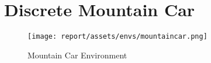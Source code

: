 \section{Discrete Mountain Car}
\begin{figure}[h!]
    \centering
    \texttt{[image: report/assets/envs/mountaincar.png]}
    \caption{Mountain Car Environment \cite{1606.01540, Moore90efficientmemory-based}}
    \label{fig:cartpole}
\end{figure}
\cite{1606.01540, Moore90efficientmemory-based}
